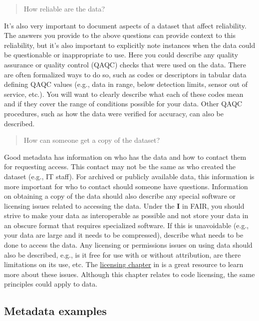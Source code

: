 \documentclass[
]{book}
\begin{document}
\begin{quote}
How reliable are the data?
\end{quote}

It's also very important to document aspects of a dataset that affect reliability. The answers you provide to the above questions can provide context to this reliability, but it's also important to explicitly note instances when the data could be questionable or inappropriate to use. Here you could describe any quality assurance or quality control (QAQC) checks that were used on the data. There are often formalized ways to do so, such as codes or descriptors in tabular data defining QAQC values (e.g., data in range, below detection limits, sensor out of service, etc.). You will want to clearly describe what each of these codes mean and if they cover the range of conditions possible for your data. Other QAQC procedures, such as how the data were verified for accuracy, can also be described.

\begin{quote}
How can someone get a copy of the dataset?
\end{quote}

Good metadata has information on who has the data and how to contact them for requesting access. This contact may not be the same as who created the dataset (e.g., IT staff). For archived or publicly available data, this information is more important for who to contact should someone have questions. Information on obtaining a copy of the data should also describe any special software or licensing issues related to accessing the data. Under the \textbf{I} in FAIR, you should strive to make your data as interoperable as possible and not store your data in an obscure format that requires specialized software. If this is unavoidable (e.g., your data are large and it needs to be compressed), describe what needs to be done to access the data. Any licensing or permissions issues on using data should also be described, e.g., is it free for use with or without attribution, are there limitations on its use, etc. The \href{https://r-pkgs.org/license.html}{licensing chapter} in \citet{Wickham15} is a great resource to learn more about these issues. Although this chapter relates to code licensing, the same principles could apply to data.

\subsection{Metadata examples}\label{metadata}
\end{document}
